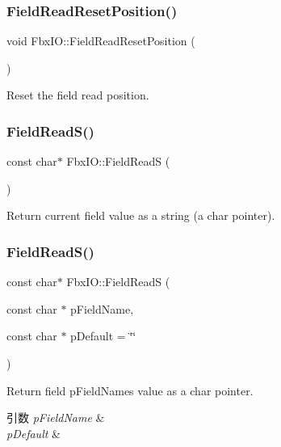 \subsubsection{\texorpdfstring{Field\+Read\+Reset\+Position()}{FieldReadResetPosition()}}
{\footnotesize\ttfamily void Fbx\+I\+O\+::\+Field\+Read\+Reset\+Position (\begin{DoxyParamCaption}{ }\end{DoxyParamCaption})}

Reset the field read position. \mbox{\label{class_fbx_i_o_af6d036e6ffdf7d66d16f6ff0ae5768f9}} 
\subsubsection{\texorpdfstring{Field\+Read\+S()}{FieldReadS()}\hspace{0.1cm}{\footnotesize\ttfamily [1/2]}}
{\footnotesize\ttfamily const char$\ast$ Fbx\+I\+O\+::\+Field\+ReadS (\begin{DoxyParamCaption}{ }\end{DoxyParamCaption})}



Return current field value as a string (a char pointer). 

\mbox{\label{class_fbx_i_o_a2357162d92bcbc9e26d6c1bd608beeb2}} 
\subsubsection{\texorpdfstring{Field\+Read\+S()}{FieldReadS()}\hspace{0.1cm}{\footnotesize\ttfamily [2/2]}}
{\footnotesize\ttfamily const char$\ast$ Fbx\+I\+O\+::\+Field\+ReadS (\begin{DoxyParamCaption}\item[{const char $\ast$}]{p\+Field\+Name,  }\item[{const char $\ast$}]{p\+Default = {\ttfamily \char`\"{}\char`\"{}} }\end{DoxyParamCaption})}

Return field p\+Field\+Name\textquotesingle{}s value as a char pointer. 
\begin{DoxyParams}{引数}
{\em p\+Field\+Name} & \\
\hline
{\em p\+Default} & \\
\hline
\end{DoxyParams}
\mbox{\label{class_fbx_i_o_a5d2e7076e0881341978f412613e57a9e}} 
